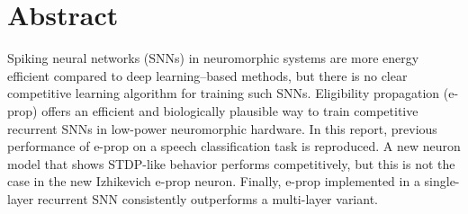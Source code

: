 \begingroup
\let\clearpage\relax
\let\cleardoublepage\relax
\let\cleardoublepage\relax

\chapter*{Abstract}
Spiking neural networks (SNNs) in neuromorphic systems are more energy efficient compared to deep learning--based methods, but there is no clear competitive learning algorithm for training such SNNs.
Eligibility propagation (e-prop) offers an efficient and biologically plausible way to train competitive recurrent SNNs in low-power neuromorphic hardware.
In this report, previous performance of e-prop on a speech classification task is reproduced.
A new neuron model that shows STDP-like behavior performs competitively, but this is not the case in the new Izhikevich e-prop neuron.
Finally, e-prop implemented in a single-layer recurrent SNN consistently outperforms a multi-layer variant.

\endgroup

\vfill
